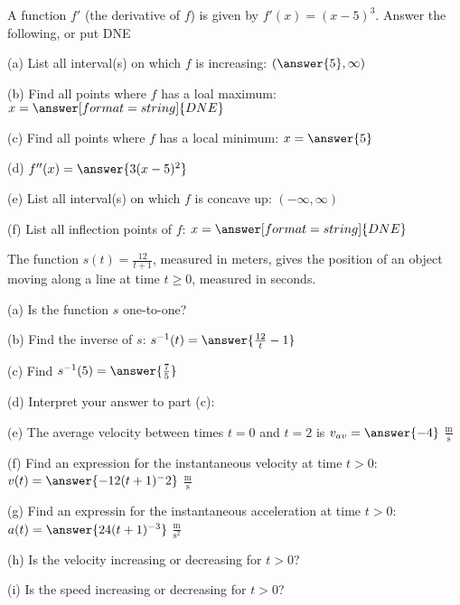 \documentclass{ximera}
\begin{document}
\begin{exercise}
A function $f'$ (the derivative of $f$) is given by $f'(x)=(x-5)^3$. Answer the following, or put DNE

(a) List all interval(s) on which $f$ is increasing: $(\answer{5},\infty)$

(b) Find all points where $f$ has a loal maximum: $x=\answer[format=string]{DNE}$

(c) Find all points where $f$ has a local minimum: $x=\answer{5}$

(d) $f''(x)=\answer{3(x-5)^2}$

(e) List all interval(s) on which $f$ is concave up: $(-\infty,\infty)$

(f) List all inflection points of $f$: $x=\answer[format=string]{DNE}$

\end{exercise}

\begin{exercise}
The function $s(t)=\frac{12}{t+1}$, measured in meters, gives the position of an object moving along a line at time $t\geq 0$, measured in seconds.

(a) Is the function $s$ one-to-one? 
\begin{multipleChoice}
\end{multipleChoice}

(b) Find the inverse of $s$: $s^{-1}(t)=\answer{\frac{12}{t}-1}$

(c) Find $s^{-1}(5)=\answer{\frac{7}{5}}$

(d) Interpret your answer to part (c):
\begin{multipleChoice}
\end{multipleChoice}

(e) The average velocity between times $t=0$ and $t=2$ is $v_{av}=\answer{-4}$ $\frac{\text{m}}{\text{s}}$

(f) Find an expression for the instantaneous velocity at time $t>0$: $v(t)=\answer{-12(t+1)^-2}$ $\frac{\text{m}}{\text{s}}$

(g) Find an expressin for the instantaneous acceleration at time $t>0$: $a(t)=\answer{24(t+1)^{-3}}$ $\frac{\text{m}}{\text{s}^2}$

(h) Is the velocity increasing or decreasing for $t>0$?
\begin{multipleChoice}
\end{multipleChoice}

(i) Is the speed increasing or decreasing for $t>0$?
\begin{multipleChoice}
\end{multipleChoice}
\end{exercise}
\end{document}
